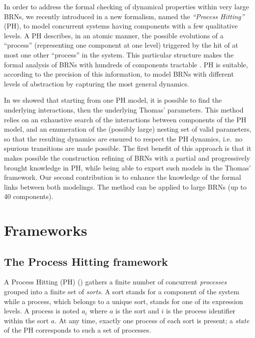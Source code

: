 \documentclass[11pt,a4paper,twoside]{epig}
\def\pref{\prettyref}
\newcounter{la}
\newcommand{\ie}{i.e.\ }
\begin{document}
In order to address the formal checking of dynamical properties within very large BRNs, we recently
introduced in \cite{PMR10-TCSB} a new formalism, named the \emph{``Process Hitting''} (PH), to model
concurrent systems having components with a few qualitative levels.
A PH describes, in an atomic manner, the possible evolutions of a “process” (representing one
component at one level) triggered by the hit of at most one other “process” in the system.
This particular structure makes the formal analysis of BRNs with hundreds of components tractable \cite{PMR12-MSCS}.
PH is suitable, according to the precision of this information, to model BRNs with different levels of abstraction by capturing the most general dynamics.

In \cite{FPIMR12-CMSB} we showed that starting from one PH model,
it is possible to find the underlying interactions, then the underlying Thomas' parameters.
This method relies on an exhaustive search of the interactions between components of the PH model,
and an enumeration of the (possibly large) nesting set of valid parameters,
so that the resulting dynamics are ensured to respect the PH dynamics, \ie no spurious transitions are made possible.
The first benefit of this approach is that it makes possible the construction refining of BRNs with a partial and progressively brought knowledge in PH, while being able to export such models in the Thomas' framework.
Our second contribution is to enhance the knowledge of the formal links between both modelings.
The method can be applied to large BRNs (up to 40 components).

\section{Frameworks}\label{sec:frameworks}
%
\subsection{The Process Hitting framework}
\label{ssec:PH}

A Process Hitting (PH) (\pref{def:PH}) gathers a finite number of concurrent \emph{processes}
grouped into a finite set of \emph{sorts}.
A sort stands for a component of the system while a process, which belongs to a unique sort, stands for one of its expression levels.
A process is noted $a_i$ where $a$ is the sort and $i$ is the process identifier within the sort $a$.
At any time, exactly one process of each sort is present; a \emph{state} of the PH corresponds to such a set of processes.
 
\end{document}
